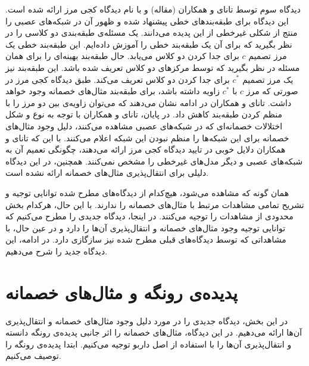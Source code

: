 \documentclass[12pt,onecolumn,a4paper]{article}
\begin{document}
دیدگاه سوم توسط تانای و همکاران
(مقاله)
 و با نام دیدگاه کجی مرز ارائه شده است. این دیدگاه برای طبقه‌بندهای خطی پیشنهاد شده و ظهور آن در شبکه‌های عصبی را منتج از شکلی غیرخطی از این پدیده می‌دانند. یک مسئله‌ی طبقه‌بندی دو کلاسی را در نظر بگیرید که برای آن یک طبقه‌بند خطی را آموزش داده‌ایم. این طبقه‌بند خطی یک مرز تصمیم
 $c$
 برای جدا کردن دو کلاس می‌یابد. حال طبقه‌بند بهینه‌ای را برای همان مسئله در نظر بگیرید که توسط مرکزهای دو کلاس تعریف شده باشد. این طبقه‌بند نیز یک مرز تصمیم
 $c^*$
 برای جدا کردن دو کلاس تعریف می‌کند. طبق دیدگاه کجی مرز در صورتی که مرز
 $c$
 با
 $c^*$
 زاویه داشته باشد، برای طبقه‌بند مثال‌های خصمانه وجود خواهد داشت. تانای و همکاران در ادامه نشان می‌دهند که می‌توان زاویه‌ی بین دو مرز را با منظم کردن
طبقه‌بند کاهش داد. در پایان، تانای و همکاران با توجه به نوع و شکل اختلالات خصمانه‌ای که در شبکه‌های عصبی مشاهده می‌کنند، دلیل وجود مثال‌های خصمانه برای این شبکه‌ها را منظم نبودن این شبکه اعلام می‌کنند. با این که تانای و همکاران دلایل خوبی در تایید دیدگاه کجی مرز ارائه می‌دهند، چگونگی تعمیم آن به شبکه‌های عصبی و دیگر مدل‌های غیرخطی را مشخص نمی‌کنند. همچنین، در این دیدگاه دلیلی برای انتقال‌پذیری مثال‌های خصمانه ارائه نشده است.

همان گونه که مشاهده می‌شود، هیچ‌کدام از دیدگاه‌های مطرح شده توانایی توجیه و تشریح تمامی مشاهدات مرتبط با مثال‌های خصمانه را ندارند. با این حال، هرکدام بخش محدودی از مشاهدات را توجیه می‌کنند. در اینجا، دیدگاه جدیدی را مطرح می‌کنیم که توانایی توجیه وجود مثال‌های خصمانه و انتقال‌پذیری آن‌ها را دارد و  در عین حال، با مشاهداتی که توسط دیدگاه‌های قبلی مطرح شده نیز سازگازی دارد. در ادامه، این دیدگاه جدید را شرح می‌دهیم.

\section{پدیده‌ی رونگه و مثال‌های خصمانه}
در این بخش، دیدگاه جدیدی را در مورد دلیل وجود مثال‌های خصمانه و انتقال‌پذیری آن‌ها ارائه می‌دهیم. در این دیدگاه، مثال‌های خصمانه را اثر جانبی پدیده‌ی رونگه دانسته و انتقال‌پذیری آن‌ها را با استفاده از اصل داربو توجیه می‌کنیم. ابتدا پدیده‌ی رونگه را توصیف می‌کنیم.
\end{document}
